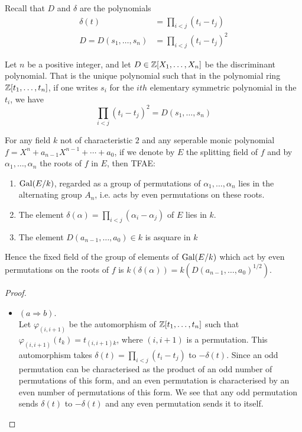 	\begin{bergman}
    Recall that $D$ and $\delta$ are the polynomials 
		\begin{align*}
			\delta(t) &= \prod_{i<j}(t_i-t_j)\\
			D = D(s_1,\ldots,s_n)&= \prod_{i<j}{(t_i-t_j)}^2
		\end{align*}
    \begin{lemma}
  Let $n$ be a positive integer, and let $D\in \mathbb{Z}[X_1,\ldots,X_n]$ be the discriminant polynomial. That is the unique polynomial such that in the polynomial ring $\mathbb{Z}[t_1,\ldots,t_n]$, if one writes $s_i$ for the $ith$ elementary symmetric polynomial in the $t_i$, we have \[
\prod_{i<j} {(t_i-t_j)}^2 = D(s_1,\ldots,s_n)  
\]

  For any field $k$ not of characteristic $2$ and any seperable monic polynomial $f = X^n + a_{n-1}X^{n-1}+\cdots + a_0$, if we denote by $E$ the splitting field of $f$ and by $\alpha_1,\ldots,\alpha_n$ the roots of $f$ in $E$, then TFAE:\begin{enumerate}[label = (\alph*)]
    \item $\text{Gal}(E/k)$, regarded as a group of permutations of $\alpha_1,\ldots,\alpha_n$ lies in the alternating group $A_n$, i.e. acts by even permutations on these roots.
    \item The element $\delta(\alpha) = \prod_{i<j}(\alpha_i-\alpha_j)$ of $E$ lies in $k$.
    \item The element $D(a_{n-1},\ldots,a_0)\in k$ is  asquare in $k$
  \end{enumerate}
  Hence the fixed field of the group of elements of $\text{Gal}(E/k)$ which act by even permutations on the roots of $f$ is $k(\delta(\alpha)) = k({D(a_{n-1},\ldots,a_0)}^{1/2})$.
\end{lemma}
\begin{proof}
  \begin{itemize}
    \item $(a\Rightarrow b)$. \\ Let $\varphi_{(i,i+1)}$ be the automorphism of $\mathbb{Z}[t_1,\ldots,t_n]$ such that $\varphi_{(i,i+1)}(t_k) = t_{(i,i+1)k}$, where $(i,i+1)$ is a permutation. This automorphism takes $\delta(t) = \prod_{i<j}(t_i-t_j)$ to $-\delta(t)$. Since an odd permutation can be characterised as the product of an odd number of permutations of this form, and an even permutation is characterised by an even number of permutations of this form.
    We see that any odd permutation sends $\delta(t)$ to $-\delta(t)$ and any even permutation sends it to itself.


\end{itemize}
\end{proof}
\end{bergman}

